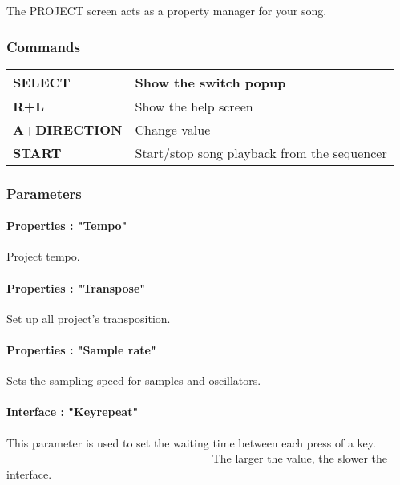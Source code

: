 The PROJECT screen acts as a property manager for your song.


\subsubsection{Commands}
\tablelasttail{\hline}
\begin{supertabular}{|l|p{11cm}|}
\hline
    {\bf SELECT} & Show the switch popup \\
    \hline
    {\bf R+L} & Show the help screen \\
    \hline
    {\bf A+DIRECTION} & Change value \\
    \hline
    {\bf START} & Start/stop song playback from the sequencer \\
\end{supertabular}

\subsubsection{Parameters}

\paragraph{Properties : "Tempo"} Project tempo.

\paragraph{Properties : "Transpose"} Set up all project's transposition.

\paragraph{Properties : "Sample rate"} Sets the sampling speed for samples and oscillators.

\paragraph{Interface : "Keyrepeat"} This parameter is used to set the waiting time between each press of a key.
                                     The larger the value, the slower the interface.

